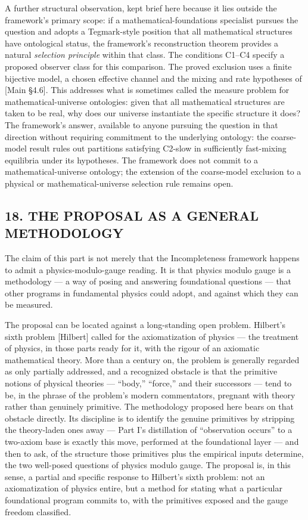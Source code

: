 \documentclass[
]{article}
\begin{document}
A further structural observation, kept brief here because it lies
outside the framework's primary scope: if a mathematical-foundations
specialist pursues the question and adopts a Tegmark-style position that
all mathematical structures have ontological status, the framework's
reconstruction theorem provides a natural \emph{selection principle}
within that class. The conditions C1--C4 specify a proposed observer
class for this comparison. The proved exclusion uses a finite bijective
model, a chosen effective channel and the mixing and rate hypotheses of
{[}Main §4.6{]}. This addresses what is sometimes called the measure
problem for mathematical-universe ontologies: given that all
mathematical structures are taken to be real, why does our universe
instantiate the specific structure it does? The framework's answer,
available to anyone pursuing the question in that direction without
requiring commitment to the underlying ontology: the coarse-model result
rules out partitions satisfying C2-slow in sufficiently fast-mixing
equilibria under its hypotheses. The framework does not commit to a
mathematical-universe ontology; the extension of the coarse-model
exclusion to a physical or mathematical-universe selection rule remains
open.

\hypertarget{the-proposal-as-a-general-methodology}{%
\subsection{18. THE PROPOSAL AS A GENERAL
METHODOLOGY}\label{the-proposal-as-a-general-methodology}}

The claim of this part is not merely that the Incompleteness framework
happens to admit a physics-modulo-gauge reading. It is that physics
modulo gauge is a methodology --- a way of posing and answering
foundational questions --- that other programs in fundamental physics
could adopt, and against which they can be measured.

The proposal can be located against a long-standing open problem.
Hilbert's sixth problem {[}Hilbert{]} called for the axiomatization of
physics --- the treatment of physics, in those parts ready for it, with
the rigour of an axiomatic mathematical theory. More than a century on,
the problem is generally regarded as only partially addressed, and a
recognized obstacle is that the primitive notions of physical theories
--- ``body,'' ``force,'' and their successors --- tend to be, in the
phrase of the problem's modern commentators, pregnant with theory rather
than genuinely primitive. The methodology proposed here bears on that
obstacle directly. Its discipline is to identify the genuine primitives
by stripping the theory-laden ones away --- Part I's distillation of
``observation occurs'' to a two-axiom base is exactly this move,
performed at the foundational layer --- and then to ask, of the
structure those primitives plus the empirical inputs determine, the two
well-posed questions of physics modulo gauge. The proposal is, in this
sense, a partial and specific response to Hilbert's sixth problem: not
an axiomatization of physics entire, but a method for stating what a
particular foundational program commits to, with the primitives exposed
and the gauge freedom classified.
\end{document}
